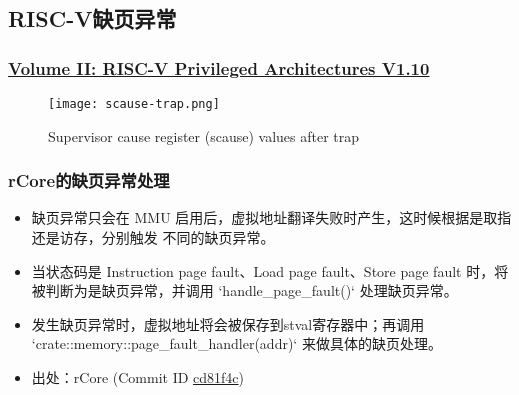 \subsection{RISC-V缺页异常}
\begin{frame}   
	\frametitle{\href{https://content.riscv.org/wp-content/uploads/2017/05/riscv-privileged-v1.10.pdf}{Volume II: RISC-V Privileged Architectures V1.10}}
	\begin{figure}
	\texttt{[image: scause-trap.png]}
	\caption{Supervisor cause register (scause) values after trap}
	\end{figure}
\end{frame}
% 
% 
% 
\begin{frame}   
	\frametitle{rCore的缺页异常处理}
    \begin{itemize}
        \item 缺页异常只会在 MMU 启用后，虚拟地址翻译失败时产生，这时候根据是取指还是访存，分别触发 不同的缺页异常。 \pause
        \item 当状态码是 Instruction page fault、Load page fault、Store page fault 时，将被判断为是缺页异常，并调用 `handle\_page\_fault()` 处理缺页异常。 \pause
        \item 发生缺页异常时，虚拟地址将会被保存到stval寄存器中；再调用 `crate::memory::page\_fault\_handler(addr)` 来做具体的缺页处理。\pause
        \item 出处：rCore (Commit ID \href{https://github.com/rcore-os/rCore/tree/cd81f4cc73ea3302ed0356398525b0b56c4fca92}{cd81f4c})
    \end{itemize}
\end{frame}
% 
% 
% 
% 
